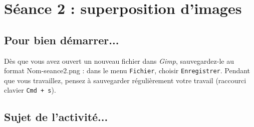 






%
%
%
%


\section{Séance 2 : superposition d'images}\label{ficheImage5e2}

\subsection{Pour bien démarrer...}

Dès que vous avez ouvert un nouveau fichier dans \emph{Gimp}, sauvegardez-le au format Nom-seance2.png : dans le menu \texttt{Fichier}, choisir \texttt{Enregistrer}. Pendant que vous travaillez, pensez à sauvegarder régulièrement votre travail (raccourci clavier \texttt{Cmd + s}).   




\subsection{Sujet de l'activité...}

\vspace{10pt}

